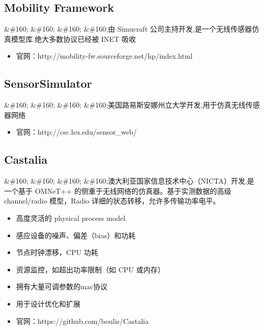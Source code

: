 \subsection{Mobility Framework}
\label{mobilityframework}

\&\#160; \&\#160; \&\#160; \&\#160;由 Simucraft 公司主持开发,是一个无线传感器仿真模型库.绝大多数协议已经被 INET 吸收

\begin{itemize}
\item 官网：http:\slash \slash mobility-fw.sourceforge.net\slash hp\slash index.html

\end{itemize}

\subsection{SensorSimulator}
\label{sensorsimulator}

\&\#160; \&\#160; \&\#160; \&\#160;美国路易斯安娜州立大学开发,用于仿真无线传感器网络

\begin{itemize}
\item 官网：http:\slash \slash csc.lsu.edu\slash sensor\_web\slash 

\end{itemize}

\subsection{Castalia}
\label{castalia}

\&\#160; \&\#160; \&\#160; \&\#160;澳大利亚国家信息技术中心（NICTA）开发,是一个基于 OMNeT++ 的侧重于无线网络的仿真器。基于实测数据的高级 channel\slash radio 模型，Radio 详细的状态转移，允许多传输功率电平。

\begin{itemize}
\item 高度灵活的 physical process model

\item 感应设备的噪声、偏差（bias）和功耗

\item 节点时钟漂移，CPU 功耗

\item 资源监控，如超出功率限制（如 CPU 或内存）

\item 拥有大量可调参数的mac协议

\item 用于设计优化和扩展

\item 官网：https:\slash \slash github.com\slash boulis\slash Castalia

\end{itemize}

